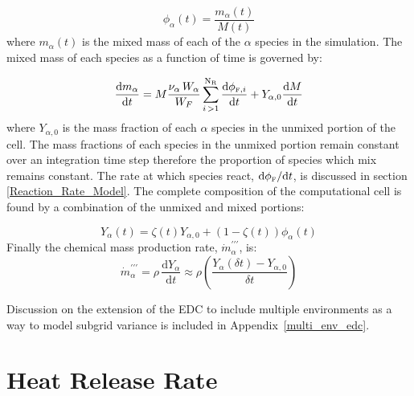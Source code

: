 \begin{equation}\label{eq:phi}
\phi_{\alpha}(t)=\frac{m_{\alpha}(t)}{M(t)}
\end{equation}
where $m_\alpha(t)$ is the mixed mass of each of the $\alpha$ species in the simulation. The mixed mass of each species as a function of time is governed by:

\begin{equation}\label{eq:mixmass}
\frac{\mbox{d}m_{\alpha}}{\mbox{d}t}=M\frac{\nu_{\alpha} \, W_{\alpha}}{W_F}\displaystyle \sum_{i\,>1}^{\mathrm{N_{R}}}\frac{\mbox{d}\phi_{{\tiny \hbox{F}},i}}{\mbox{d}t}+Y_{\alpha,0}\frac{\mbox{d}M}{\mbox{d}t} 
\end{equation}
where $Y_{\alpha,0}$ is the mass fraction of each $\alpha$ species in the unmixed portion of the cell. The mass fractions of each species in the unmixed portion remain constant over an integration time step therefore the proportion of species which mix remains constant. The rate at which species react, $\mbox{d}\phi_{\tiny \hbox{F}}/\mbox{d}t$, is discussed in section \ref{Reaction_Rate_Model}. The complete composition of the computational cell is found by a combination of the unmixed and mixed portions:

\begin{equation}\label{eq:final_comp}
Y_{\alpha}(t)=\zeta(t)Y_{\alpha,0}+(1-\zeta(t))\phi_{\alpha}(t)
\end{equation}
Finally the chemical mass production rate, $\dot{m}^{\prime\prime\prime}_{\alpha}$, is:
\begin{equation}\label{mass_prod_rate}
\dot{m}^{\prime\prime\prime}_{\alpha}=\rho \,\frac{\mbox{d}Y_{\alpha}}{\mbox{d}t} \approx \rho \left(\frac{Y_{\alpha}(\delta t) - Y_{\alpha,0}}{\delta t}\right)
\end{equation}

Discussion on the extension of the EDC to include multiple environments as a way to model subgrid variance is included in Appendix~{\ref{multi_env_edc}}.

\section{Heat Release Rate}

